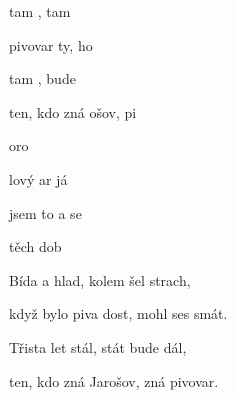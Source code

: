 

\zs
{} tam ,  tam 

pivovar ty,  ho 

 tam ,  bude 

ten, kdo zná ošov,  pi
\ks

\zr
{}   oro

lový ar já 

 jsem to  a  se 

 těch dob  
\kr

\zs
Bída a hlad, kolem šel strach,

když bylo piva dost, mohl ses smát.

Třista let stál, stát bude dál,

ten, kdo zná Jarošov, zná pivovar.
\ks

\zr \kr


\kp


